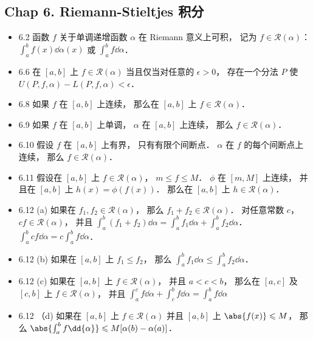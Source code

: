 \subsection{Chap 6. Riemann-Stieltjes 积分}
\begin{itemize}
\item 6.2 函数 $f$ 关于单调递增函数 $\alpha$ 在 Riemann 意义上可积， 记为 $f\in \mathcal{R}(\alpha)$： $\int_a^b f(x) \dd\alpha(x)$ 或 $\int_a^b f\dd{\alpha}$．

\item 6.6 在 $[a,b]$ 上 $f\in\mathcal{R}(\alpha)$ 当且仅当对任意的 $\epsilon>0$， 存在一个分法 $P$ 使 $U(P,f,\alpha)-L(P,f,\alpha)<\epsilon$．

\item 6.8 如果 $f$ 在 $[a,b]$ 上连续， 那么在 $[a,b]$ 上 $f\in \mathcal{R}(\alpha)$．

\item 6.9 如果 $f$ 在 $[a,b]$ 上单调， $\alpha$ 在 $[a,b]$ 上连续， 那么 $f\in \mathcal{R}(\alpha)$．

\item 6.10 假设 $f$ 在 $[a,b]$ 上有界， 只有有限个间断点． $\alpha$ 在 $f$ 的每个间断点上连续， 那么 $f\in \mathcal{R}(\alpha)$．

\item 6.11 假设在 $[a,b]$ 上 $f\in \mathcal{R}(\alpha)$， $m\leqslant f\leqslant M$． $\phi$ 在 $[m, M]$ 上连续， 并且在 $[a,b]$ 上 $h(x) = \phi(f(x))$． 那么在 $[a,b]$ 上 $h\in \mathcal{R}(\alpha)$．

\item 6.12 (a) 如果在 $f_1,f_2 \in \mathcal{R}(\alpha)$， 那么 $f_1+f_2 \in \mathcal{R}(\alpha)$． 对任意常数 $c$， $cf\in \mathcal{R}(\alpha)$， 并且 $\int_a^b (f_1+f_2)\dd{\alpha} = \int_a^bf_1\dd{\alpha} + \int_a^bf_2\dd{\alpha}$． $\int_a^b cf\dd{\alpha} = c\int_a^b f\dd{\alpha}$．

\item  6.12 (b) 如果在 $[a,b]$ 上 $f_1\leqslant f_2$， 那么 $\int_a^bf_1\dd{\alpha} \leqslant \int_a^bf_2\dd{\alpha}$．

\item  6.12 (c) 如果在 $[a,b]$ 上 $f\in \mathcal{R}(\alpha)$， 并且 $a<c< b$， 那么在 $[a,c]$ 及 $[c,b]$ 上 $f\in \mathcal{R}(\alpha)$， 并且 $\int_a^cf\dd{\alpha}+\int_c^bf\dd{\alpha} = \int_a^bf\dd{\alpha}$

\item 6.12 （d) 如果在 $[a,b]$ 上 $f\in \mathcal{R}(\alpha)$ 并且 $[a,b]$ 上 $\abs{f(x)}\leqslant M$， 那么 $\abs{\int_a^bf\dd{\alpha}} \leqslant M[\alpha(b)-\alpha(a)]$．


\end{itemize}
